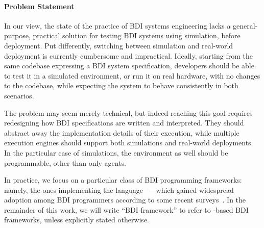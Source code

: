 \paragraph{Problem Statement}
In our view,
the state of the practice of \ac{BDI} systems engineering
lacks a general-purpose, practical solution for testing \ac{BDI} systems using simulation,
before deployment.
%
Put differently,
switching between simulation and real-world deployment is currently cumbersome and impractical.
%
Ideally,
starting from the same codebase expressing a \ac{BDI} system specification,
developers should be able to test it in a simulated environment,
or run it on real hardware,
with no changes to the codebase,
while expecting the system to behave consistently in both scenarios.

The problem may seem merely technical,
but indeed reaching this goal requires redesigning how \ac{BDI} specifications are written and interpreted.
%
They should abstract away the implementation details of their execution,
while multiple execution engines should support both simulations and real-world deployments.
%
In the particular case of simulations,
the environment as well should be programmable,
other than only agents.


In practice,
we focus on a particular class of \ac{BDI} programming frameworks:
namely,
the ones implementing the \agentspeak{} language~\cite{RaoG95}%
---which gained widespread adoption among \ac{BDI} programmers
according to some recent surveys~\cite{computers10020016,CalegariCMO21}.
%
In the remainder of this work,
we will write ``\ac{BDI} framework'' to refer to \agentspeak{}-based \ac{BDI} frameworks,
unless explicitly stated otherwise.

